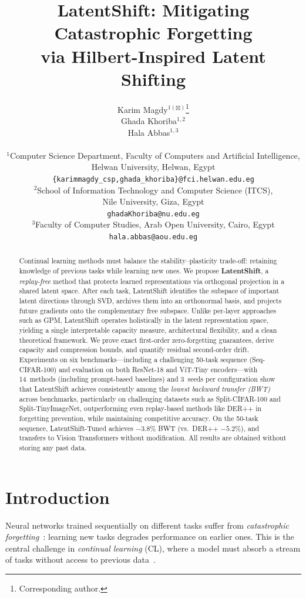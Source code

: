 \documentclass{article}
\title{LatentShift: Mitigating Catastrophic Forgetting\\via Hilbert-Inspired Latent Shifting}
\author{
  Karim Magdy$^{1(\boxtimes)}$\thanks{Corresponding author.} \\
  \And
  Ghada Khoriba$^{1,2}$ \\
  \And
  Hala Abbas$^{1,3}$ \\
  \\
  $^1$Computer Science Department, Faculty of Computers and Artificial Intelligence, \\
  Helwan University, Helwan, Egypt \\
  \texttt{\{karimmagdy\_csp,ghada\_khoriba\}@fci.helwan.edu.eg} \\
  $^2$School of Information Technology and Computer Science (ITCS), \\
  Nile University, Giza, Egypt \\
  \texttt{ghadaKhoriba@nu.edu.eg} \\
  $^3$Faculty of Computer Studies, Arab Open University, Cairo, Egypt \\
  \texttt{hala.abbas@aou.edu.eg}
}
\date{}
\begin{document}
\maketitle

\begin{abstract}
Continual learning methods must balance the stability--plasticity trade-off:
retaining knowledge of previous tasks while learning new ones.
We propose \textbf{LatentShift}, a \emph{replay-free} method that protects
learned representations via orthogonal projection in a shared latent space. After each task, LatentShift identifies the
subspace of important latent directions through SVD, archives them into an
orthonormal basis, and projects future gradients onto the complementary free
subspace. Unlike per-layer approaches such as GPM, LatentShift operates
holistically in the latent representation space, yielding a single
interpretable capacity measure, architectural flexibility, and a clean
theoretical framework. We prove exact first-order zero-forgetting guarantees,
derive capacity and compression bounds, and quantify residual second-order
drift. Experiments on six benchmarks---including a challenging
50-task sequence (Seq-CIFAR-100) and evaluation on both ResNet-18 and
ViT-Tiny encoders---with 14~methods (including prompt-based baselines) and 3~seeds per configuration show that
LatentShift achieves consistently among the \emph{lowest backward transfer (BWT)} across benchmarks, particularly on challenging datasets such as Split-CIFAR-100 and Split-TinyImageNet, outperforming even replay-based methods like DER++ in forgetting
prevention, while maintaining competitive accuracy. On the 50-task sequence,
LatentShift-Tuned achieves $-3.8\%$ BWT (vs.\ DER++ $-5.2\%$), and transfers
to Vision Transformers without modification. All results are obtained without
storing any past data.
\end{abstract}

\section{Introduction}
\label{sec:intro}

Neural networks trained sequentially on different tasks suffer from
\emph{catastrophic forgetting}~\citep{mccloskey1989catastrophic,french1999catastrophic}:
learning new tasks degrades performance on earlier ones. This is the central
challenge in \emph{continual learning} (CL), where a model must absorb a
stream of tasks without access to previous
data~\citep{parisi2019continual,delange2021continual}.
\end{document}
